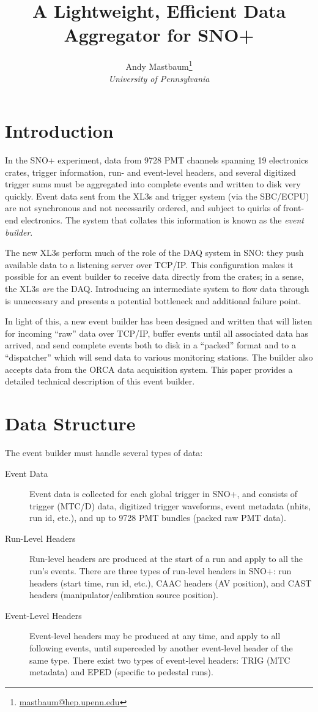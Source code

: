 \documentclass[11pt,twocolumn]{article}
\author{Andy Mastbaum\footnote{\href{mailto:mastbaum@hep.upenn.edu}{mastbaum@hep.upenn.edu}}\\\small{\it University of Pennsylvania}}
\title{A Lightweight, Efficient Data Aggregator for SNO+}
\begin{document}
\maketitle
\section{Introduction}
In the SNO+ experiment, data from 9728 PMT channels spanning 19 electronics crates, trigger information, run- and event-level headers, and several digitized trigger sums must be aggregated into complete events and written to disk very quickly. Event data sent from the XL3s and trigger system (via the SBC/ECPU) are not synchronous and not necessarily ordered, and subject to quirks of front-end electronics. The system that collates this information is known as the {\it event builder}.

The new XL3s perform much of the role of the DAQ system in SNO: they push available data to a listening server over TCP/IP. This configuration makes it possible for an event builder to receive data directly from the crates; in a sense, the XL3s {\it are} the DAQ. Introducing an intermediate system to flow data through is unnecessary and presents a potential bottleneck and additional failure point.

In light of this, a new event builder has been designed and written that will listen for incoming ``raw'' data over TCP/IP, buffer events until all associated data has arrived, and send complete events both to disk in a ``packed'' format and to a ``dispatcher'' which will send data to various monitoring stations. The builder also accepts data from the ORCA data acquisition system. This paper provides a detailed technical description of this event builder.

\section{Data Structure}
The event builder must handle several types of data:
\begin{description}
\item[Event Data] Event data is collected for each global trigger in SNO+, and consists of trigger (MTC/D) data, digitized trigger waveforms, event metadata (nhits, run id, etc.), and up to 9728 PMT bundles (packed raw PMT data).
\item[Run-Level Headers] Run-level headers are produced at the start of a run and apply to all the run's events. There are three types of run-level headers in SNO+: run headers (start time, run id, etc.), CAAC headers (AV position), and CAST headers (manipulator/calibration source position).
\item[Event-Level Headers] Event-level headers may be produced at any time, and apply to all following events, until superceded by another event-level header of the same type. There exist two types of event-level headers: TRIG (MTC metadata) and EPED (specific to pedestal runs).
\end{description}
\end{document}

